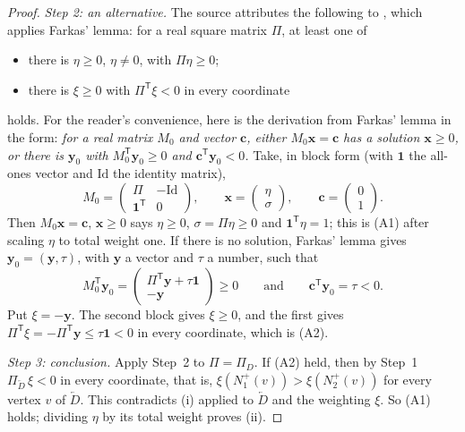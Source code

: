 \documentclass[11pt]{article}
\theoremstyle{remark}
\newcommand{\tp}{^{\mathsf T}}
\begin{document}
\begin{proof}
\emph{Step 2: an alternative.} The source attributes the following to
\cite[Theorem~1]{Seacrest2015}, which applies Farkas' lemma: for a real
square matrix $\Pi$, at least one of
\begin{itemize}[leftmargin=2.5em]
\item[(A1)] there is $\eta\ge0$, $\eta\ne0$, with $\Pi\eta\ge0$;
\item[(A2)] there is $\xi\ge0$ with $\Pi\tp\xi<0$ in every coordinate
\end{itemize}
holds. For the reader's convenience, here is the derivation from Farkas'
lemma in the form: \emph{for a real matrix $M_0$ and vector $\mathbf c$,
either $M_0\mathbf x=\mathbf c$ has a solution $\mathbf x\ge0$, or there is
$\mathbf y_0$ with $M_0\tp\mathbf y_0\ge0$ and $\mathbf c\tp\mathbf y_0<0$.}
Take, in block form (with $\mathbf 1$ the all-ones vector and $\mathrm{Id}$
the identity matrix),
\[
 M_0=\begin{pmatrix}\Pi&-\mathrm{Id}\\ \mathbf 1\tp&0\end{pmatrix},
 \qquad
 \mathbf x=\begin{pmatrix}\eta\\ \sigma\end{pmatrix},
 \qquad
 \mathbf c=\begin{pmatrix}0\\ 1\end{pmatrix}.
\]
Then $M_0\mathbf x=\mathbf c$, $\mathbf x\ge0$ says $\eta\ge0$,
$\sigma=\Pi\eta\ge0$ and $\mathbf 1\tp\eta=1$; this is (A1) after scaling
$\eta$ to total weight one. If there is no solution, Farkas' lemma gives
$\mathbf y_0=(\mathbf y,\tau)$, with $\mathbf y$ a vector and $\tau$ a
number, such that
\[
 M_0\tp\mathbf y_0
 =\begin{pmatrix}\Pi\tp\mathbf y+\tau\mathbf 1\\ -\mathbf y\end{pmatrix}\ge0
 \qquad\text{and}\qquad \mathbf c\tp\mathbf y_0=\tau<0 .
\]
Put $\xi=-\mathbf y$. The second block gives $\xi\ge0$, and the first gives
$\Pi\tp\xi=-\Pi\tp\mathbf y\le\tau\mathbf 1<0$ in every coordinate, which is
(A2).

\emph{Step 3: conclusion.} Apply Step~2 to $\Pi=\Pi_D$. If (A2) held, then
by Step~1 $\Pi_{\overleftarrow D}\,\xi<0$ in every coordinate, that is,
$\xi(N_1^+(v))>\xi(N_2^+(v))$ for every vertex $v$ of $\overleftarrow D$.
This contradicts \textup{(i)} applied to $\overleftarrow D$ and the
weighting $\xi$. So (A1) holds; dividing $\eta$ by its total weight proves
\textup{(ii)}.
\end{proof}
\end{document}
